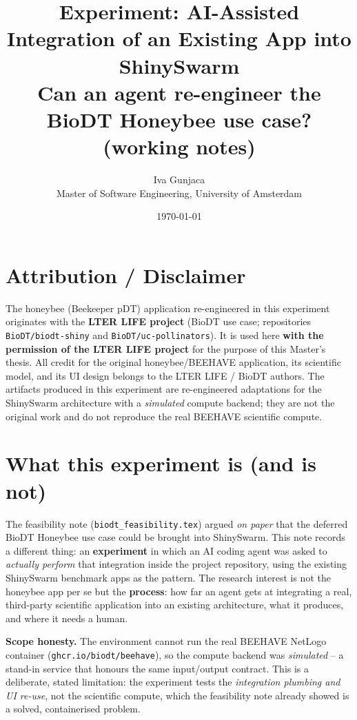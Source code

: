 \documentclass[12pt,a4paper]{article}
\title{\textbf{Experiment: AI-Assisted Integration of an Existing App into ShinySwarm}\\[0.5em]
\large Can an agent re-engineer the BioDT Honeybee use case? (working notes)}
\author{Iva Gunjaca\\
Master of Software Engineering, University of Amsterdam}
\date{\today}
\begin{document}
\maketitle

\section*{Attribution / Disclaimer}

The honeybee (Beekeeper pDT) application re-engineered in this experiment
originates with the \textbf{LTER LIFE project} (BioDT use case; repositories
\texttt{BioDT/biodt-shiny} and \texttt{BioDT/uc-pollinators}). It is used here
\textbf{with the permission of the LTER LIFE project} for the purpose of this
Master's thesis. All credit for the original honeybee/BEEHAVE application, its
scientific model, and its UI design belongs to the LTER LIFE / BioDT authors.
The artifacts produced in this experiment are re-engineered adaptations for the
ShinySwarm architecture with a \emph{simulated} compute backend; they are not
the original work and do not reproduce the real BEEHAVE scientific compute.

\section{What this experiment is (and is not)}

The feasibility note (\texttt{biodt\_feasibility.tex}) argued \emph{on paper}
that the deferred BioDT Honeybee use case could be brought into ShinySwarm. This
note records a different thing: an \textbf{experiment} in which an AI coding
agent was asked to \emph{actually perform} that integration inside the project
repository, using the existing ShinySwarm benchmark apps as the pattern. The
research interest is not the honeybee app per se but the \textbf{process}: how
far an agent gets at integrating a real, third-party scientific application into
an existing architecture, what it produces, and where it needs a human.

\textbf{Scope honesty.} The environment cannot run the real BEEHAVE NetLogo
container (\texttt{ghcr.io/biodt/beehave}), so the compute backend was
\emph{simulated} -- a stand-in service that honours the same input/output
contract. This is a deliberate, stated limitation: the experiment tests the
\emph{integration plumbing and UI re-use}, not the scientific compute, which the
feasibility note already showed is a solved, containerised problem.
\end{document}
